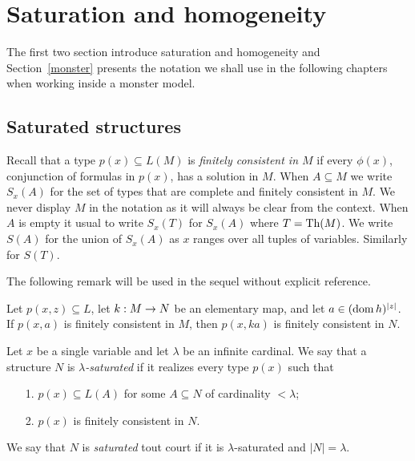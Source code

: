 \documentclass[creche.tex]{subfiles}
\begin{document}
\chapter{Saturation and homogeneity}
\label{saturation}
 
\def\medrel#1{\parbox[t]{6ex}{$\displaystyle\hfil #1$}}
\def\ceq#1#2#3{\parbox{25ex}{$\displaystyle #1$}\medrel{#2}$\displaystyle  #3$}

The first two section introduce saturation and homogeneity and Section~\ref{monster} presents the notation we shall use in the following chapters when working inside a monster model.



\section{Saturated structures}

Recall that a type $p(x)\subseteq L(M)$ is \emph{finitely consistent in $M$\/} if every $\phi(x)$, conjunction of formulas in $p(x)$, has a solution in $M$. When $A\subseteq M$ we write $S_x(A)$ for the set of types that are complete and finitely consistent in $M$. We never display $M$ in the notation as it will always be clear from the context. When $A$ is empty it usual to write $S_x(T)$ for $S_x(A)$ where $T=\textrm{Th}(M)$. We write $S(A)$ for the union of $S_x(A)$ as $x$ ranges over all tuples of variables. Similarly for $S(T)$.

The following remark will be used in the sequel without explicit reference.

\begin{remark}
Let $p(x,z)\subseteq L$, let $k:M\rightarrow N$ be an elementary map, and let $a\in(\mathop{\rm dom} h)^{|z|}$. If $p(x,a)$ is finitely consistent in $M$, then $p(x,ka)$ is finitely consistent in $N$.\QED
\end{remark}

\begin{definition}
Let $x$ be a single variable and let $\lambda$ be an infinite cardinal. We say that a structure $N$ is \emph{$\lambda$-saturated} if it realizes every type $p(x)$ such that
\begin{itemize}
\item[1.]  $p(x)\subseteq L(A)$ for some $A\subseteq N$ of cardinality $<\lambda$;
\item[2.] $p(x)$ is finitely consistent in $N$.
\end{itemize}
We say that $N$ is \emph{saturated\/} tout court if it is $\lambda$-saturated and $|N|=\lambda$.
\end{definition}
\end{document}
